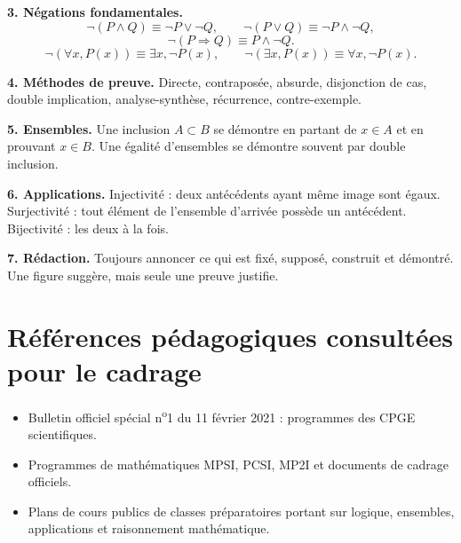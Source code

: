 \documentclass[11pt,a4paper]{article}
\begin{document}
\begin{retenirbox}
\textbf{3. Négations fondamentales.}
\[
\neg(P\land Q)\equiv\neg P\lor\neg Q,
\qquad
\neg(P\lor Q)\equiv\neg P\land\neg Q,
\]
\[
\neg(P\Rightarrow Q)\equiv P\land\neg Q.
\]
\[
\neg(\forall x, P(x))\equiv\exists x,\neg P(x),
\qquad
\neg(\exists x, P(x))\equiv\forall x,\neg P(x).
\]
\end{retenirbox}

\begin{retenirbox}
\textbf{4. Méthodes de preuve.} Directe, contraposée, absurde, disjonction de cas, double implication, analyse-synthèse, récurrence, contre-exemple.
\end{retenirbox}

\begin{retenirbox}
\textbf{5. Ensembles.} Une inclusion $A\subset B$ se démontre en partant de $x\in A$ et en prouvant $x\in B$. Une égalité d'ensembles se démontre souvent par double inclusion.
\end{retenirbox}

\begin{retenirbox}
\textbf{6. Applications.} Injectivité : deux antécédents ayant même image sont égaux. Surjectivité : tout élément de l'ensemble d'arrivée possède un antécédent. Bijectivité : les deux à la fois.
\end{retenirbox}

\begin{retenirbox}
\textbf{7. Rédaction.} Toujours annoncer ce qui est fixé, supposé, construit et démontré. Une figure suggère, mais seule une preuve justifie.
\end{retenirbox}

\section*{Références pédagogiques consultées pour le cadrage}
\begin{itemize}
  \item Bulletin officiel spécial n\textsuperscript{o}1 du 11 février 2021 : programmes des CPGE scientifiques.
  \item Programmes de mathématiques MPSI, PCSI, MP2I et documents de cadrage officiels.
  \item Plans de cours publics de classes préparatoires portant sur logique, ensembles, applications et raisonnement mathématique.
\end{itemize}
\end{document}
